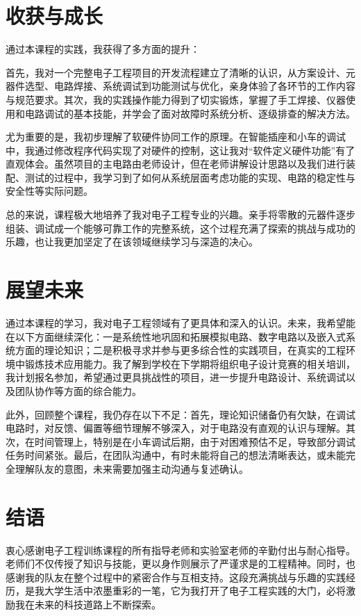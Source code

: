 \documentclass[10pt,a4paper]{ctexart}
\begin{document}
\section{收获与成长}
通过本课程的实践，我获得了多方面的提升：

首先，我对一个完整电子工程项目的开发流程建立了清晰的认识，从方案设计、元器件选型、电路焊接、系统调试到功能测试与优化，亲身体验了各环节的工作内容与规范要求。其次，我的实践操作能力得到了切实锻炼，掌握了手工焊接、仪器使用和电路调试的基本技能，并学会了面对故障时系统分析、逐级排查的解决方法。

尤为重要的是，我初步理解了软硬件协同工作的原理。在智能插座和小车的调试中，我通过修改程序代码实现了对硬件的控制，这让我对“软件定义硬件功能”有了直观体会。虽然项目的主电路由老师设计，但在老师讲解设计思路以及我们进行装配、测试的过程中，我学习到了如何从系统层面考虑功能的实现、电路的稳定性与安全性等实际问题。

总的来说，课程极大地培养了我对电子工程专业的兴趣。亲手将零散的元器件逐步组装、调试成一个能够可靠工作的完整系统，这个过程充满了探索的挑战与成功的乐趣，也让我更加坚定了在该领域继续学习与深造的决心。
\section{展望未来}
通过本课程的学习，我对电子工程领域有了更具体和深入的认识。未来，我希望能在以下方面继续深化：一是系统性地巩固和拓展模拟电路、数字电路以及嵌入式系统方面的理论知识；二是积极寻求并参与更多综合性的实践项目，在真实的工程环境中锻炼技术应用能力。我了解到学校在下学期将组织电子设计竞赛的相关培训，我计划报名参加，希望通过更具挑战性的项目，进一步提升电路设计、系统调试以及团队协作等方面的综合能力。

此外，回顾整个课程，我仍存在以下不足：首先，理论知识储备仍有欠缺，在调试电路时，对反馈、偏置等细节理解不够深入，对于电路没有直观的认识与理解。其次，在时间管理上，特别是在小车调试后期，由于对困难预估不足，导致部分调试任务时间紧张。最后，在团队沟通中，有时未能将自己的想法清晰表达，或未能完全理解队友的意图，未来需要加强主动沟通与复述确认。
\section{结语}
衷心感谢电子工程训练课程的所有指导老师和实验室老师的辛勤付出与耐心指导。老师们不仅传授了知识与技能，更以身作则展示了严谨求是的工程精神。同时，也感谢我的队友在整个过程中的紧密合作与互相支持。这段充满挑战与乐趣的实践经历，是我大学生活中浓墨重彩的一笔，它为我打开了电子工程实践的大门，必将激励我在未来的科技道路上不断探索。

\newpage
\end{document}
